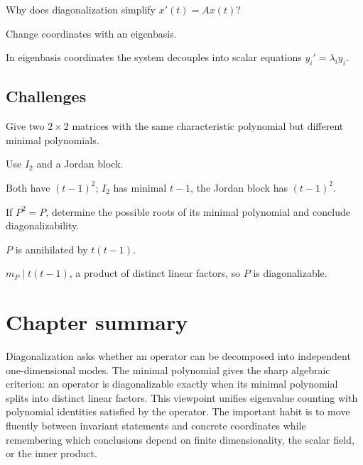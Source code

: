 \begin{exercise}\label{exr:i11-expand-14}
Why does diagonalization simplify \(x'(t)=Ax(t)\)?
\end{exercise}
\begin{hint}
Change coordinates with an eigenbasis.
\end{hint}
\begin{solution}
In eigenbasis coordinates the system decouples into scalar equations \(y_i'=\lambda_i y_i\).
\end{solution}

\subsection*{Challenges}

\begin{exercise}\label{exr:i11-expand-15}
Give two \(2\times2\) matrices with the same characteristic polynomial but different minimal polynomials.
\end{exercise}
\begin{hint}
Use \(I_2\) and a Jordan block.
\end{hint}
\begin{solution}
Both have \((t-1)^2\); \(I_2\) has minimal \(t-1\), the Jordan block has \((t-1)^2\).
\end{solution}

\begin{exercise}\label{exr:i11-expand-16}
If \(P^2=P\), determine the possible roots of its minimal polynomial and conclude diagonalizability.
\end{exercise}
\begin{hint}
\(P\) is annihilated by \(t(t-1)\).
\end{hint}
\begin{solution}
\(m_P\mid t(t-1)\), a product of distinct linear factors, so \(P\) is diagonalizable.
\end{solution}
\section*{Chapter summary}
Diagonalization asks whether an operator can be decomposed into independent one-dimensional modes. The minimal polynomial gives the sharp algebraic criterion: an operator is diagonalizable exactly when its minimal polynomial splits into distinct linear factors. This viewpoint unifies eigenvalue counting with polynomial identities satisfied by the operator.
The important habit is to move fluently between invariant statements and concrete coordinates while remembering which conclusions depend on finite dimensionality, the scalar field, or the inner product.
